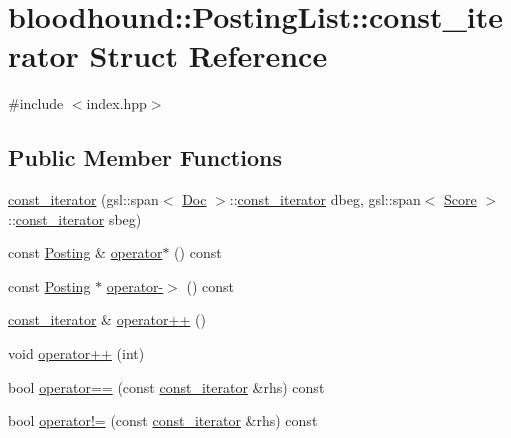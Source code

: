 \hypertarget{structbloodhound_1_1PostingList_1_1const__iterator}{}\section{bloodhound\+:\+:Posting\+List\+:\+:const\+\_\+iterator Struct Reference}
\label{structbloodhound_1_1PostingList_1_1const__iterator}


{\ttfamily \#include $<$index.\+hpp$>$}

\subsection*{Public Member Functions}
\begin{DoxyCompactItemize}
\item 
\hyperlink{structbloodhound_1_1PostingList_1_1const__iterator_acdd2e534f35cf6e082cc9d126b36f3b4}{const\+\_\+iterator} (gsl\+::span$<$ \hyperlink{structbloodhound_1_1Doc}{Doc} $>$\+::\hyperlink{structbloodhound_1_1PostingList_1_1const__iterator}{const\+\_\+iterator} dbeg, gsl\+::span$<$ \hyperlink{structbloodhound_1_1Score}{Score} $>$\+::\hyperlink{structbloodhound_1_1PostingList_1_1const__iterator}{const\+\_\+iterator} sbeg)
\item 
const \hyperlink{structbloodhound_1_1Posting}{Posting} \& \hyperlink{structbloodhound_1_1PostingList_1_1const__iterator_a0e64366185c712b9f399c4bf31ff804d}{operator$\ast$} () const
\item 
const \hyperlink{structbloodhound_1_1Posting}{Posting} $\ast$ \hyperlink{structbloodhound_1_1PostingList_1_1const__iterator_a04f6e78b6434e52526d5cc28ca3ca24a}{operator-\/$>$} () const
\item 
\hyperlink{structbloodhound_1_1PostingList_1_1const__iterator}{const\+\_\+iterator} \& \hyperlink{structbloodhound_1_1PostingList_1_1const__iterator_ab50270b2e0e133f6e026b330c83f2fe3}{operator++} ()
\item 
void \hyperlink{structbloodhound_1_1PostingList_1_1const__iterator_af53d73fb2485b8d05622c646833891bc}{operator++} (int)
\item 
bool \hyperlink{structbloodhound_1_1PostingList_1_1const__iterator_a7826592d30cee67d4af4fbda6f089fc8}{operator==} (const \hyperlink{structbloodhound_1_1PostingList_1_1const__iterator}{const\+\_\+iterator} \&rhs) const
\item 
bool \hyperlink{structbloodhound_1_1PostingList_1_1const__iterator_a65b36dcc2e29d9d2f67859a795b9d318}{operator!=} (const \hyperlink{structbloodhound_1_1PostingList_1_1const__iterator}{const\+\_\+iterator} \&rhs) const
\end{DoxyCompactItemize}
